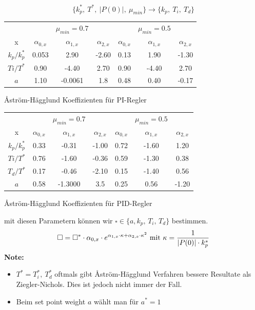         \[\{k_p^*,\ T^*,\ |P(0)|,\ \mu_{min}\} \rightarrow \{k_p,\ T_i,\ T_d\}\]
            \begin{center}
            \begin{tabular}{c|c c c|c c c}
                & & $\mu_{min} = 0.7$ & & &  $\mu_{min} = 0.5$ & \\ 
                x & $\alpha_{0,x}$ & $\alpha_{1,x}$ & $\alpha_{2,x}$ & $\alpha_{0,x}$ & $\alpha_{1,x}$ & $\alpha_{2,x}$ \\ \hline
                $k_p/k_p^*$  & 0.053 & 2.90 & -2.60 & 0.13 & 1.90 & -1.30 \\
                $Ti/T^*$ & 0.90 & -4.40 & 2.70 & 0.90 & -4.40 & 2.70\\ 
                $a$  &  1.10  &  -0.0061  &  1.8  &   0.48  &  0.40  &  -0.17\\
            \end{tabular}
            \r{A}ström-Hägglund Koeffizienten für PI-Regler

        
            \begin{tabular}{c|c c c|c c c}
                & & $\mu_{min} = 0.7$ & & &  $\mu_{min} = 0.5$ & \\ 
                x &
                $\alpha_{0,x}$ & $\alpha_{1,x}$ & $\alpha_{2,x}$ & $\alpha_{0,x}$ & $\alpha_{1,x}$ & $\alpha_{2,x}$ \\ \hline
                $k_p/k_p^*$  & 0.33 & -0.31 & -1.00 & 0.72 & -1.60 & 1.20 \\
                $Ti/T^*$ & 0.76 & -1.60 & -0.36 & 0.59 & -1.30 & 0.38 \\
                $T_d/T^*$ & 0.17 & -0.46 & -2.10 & 0.15 & -1.40 & 0.56\\
                $a$  &  0.58  &  -1.3000  &  3.5  &   0.25  &  0.56  &  -1.20\\
            \end{tabular}    
            \r{A}ström-Hägglund Koeffizienten für PID-Regler 
            
            \end{center}
            
            mit diesen Parametern können wir $\square \in \{a, k_p,\, T_i,\, T_d\}$ bestimmen.
            \[ \square = \square^* \cdot \alpha_{0,x} \cdot e^{\alpha_{1,x} \cdot \kappa + \alpha_{2,x} \cdot \kappa^2}
            \ \textnormal{mit} \ \kappa = \frac{1}{|P(0)| \cdot k_p^*} \]
            \textbf{Note:}
            \begin{itemize}
                \item $T^* = T_i^*,\  T_d^*$ oftmals gibt \r{A}ström-Hägglund Verfahren bessere Resultate als Ziegler-Nichols. Dies ist jedoch nicht immer der Fall. 
                \item Beim set point weight $a$ wählt man für $a^* = 1$ 
            \end{itemize}
            
